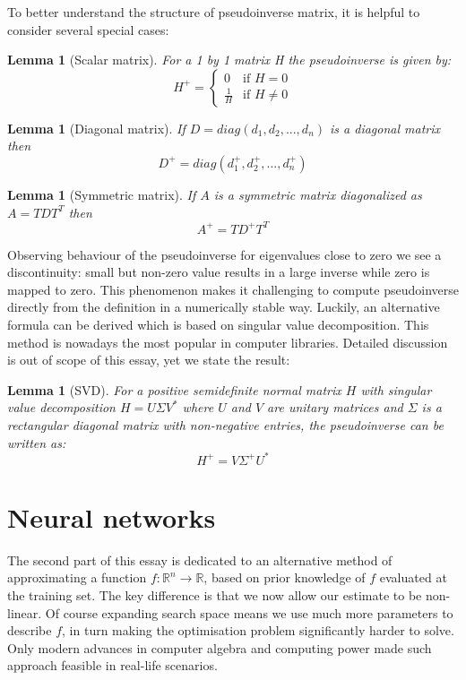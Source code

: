 \documentclass[a4paper]{article}
\theoremstyle{break}
\newtheorem{lemma}[theorem]{Lemma}
\newcommand{\R}{\mathbb{R}}
\begin{document}
To better understand the structure of pseudoinverse matrix, it is helpful to consider several special cases:
\begin{lemma}[Scalar matrix]
    For a 1 by 1 matrix H the pseudoinverse is given by:
    $$ H^+ = \begin{cases}
        0~~~           \text{ if } H = 0\\
        \frac{1}{H}~~ \text{ if } H \neq 0
    \end{cases}$$
\end{lemma}
\begin{lemma}[Diagonal matrix]
    If $D = diag(d_1, d_2, ..., d_n)$ is a diagonal matrix then
    $$ D^+ = diag(d_1^+, d_2^+, ..., d_n^+) $$
\end{lemma}
\begin{lemma}[Symmetric matrix]
    If $A$ is a symmetric matrix diagonalized as $A = T D T^T $ then
    $$ A^+ = T D^+ T^T$$
\end{lemma}

Observing behaviour of the pseudoinverse for eigenvalues close to zero we see a discontinuity: small but non-zero value results in a large inverse while zero is mapped to zero. This phenomenon makes it challenging to compute pseudoinverse directly from the definition in a numerically stable way. Luckily, an alternative formula can be derived which is based on singular value decomposition. This method is nowadays the most popular in computer libraries. Detailed discussion is out of scope of this essay, yet we state the result:
\begin{lemma}[SVD]
    For a positive semidefinite normal matrix $H$ with singular value decomposition $H = U \Sigma V^*$ where $U$ and $V$ are unitary matrices and $\Sigma$ is a rectangular diagonal matrix with non-negative entries, the pseudoinverse can be written as:
    $$ H^+ = V \Sigma^+ U^* $$
\end{lemma}
\pagebreak
\section{Neural networks}
The second part of this essay is dedicated to an alternative method of approximating a function $ f : \R^n \to \R$, based on prior knowledge of $f$ evaluated at the training set. The key difference is that we now allow our estimate to be non-linear. Of course expanding search space means we use much more parameters to describe $f$, in turn making the optimisation problem significantly harder to solve. Only modern advances in computer algebra and computing power made such approach feasible in real-life scenarios.
\end{document}

